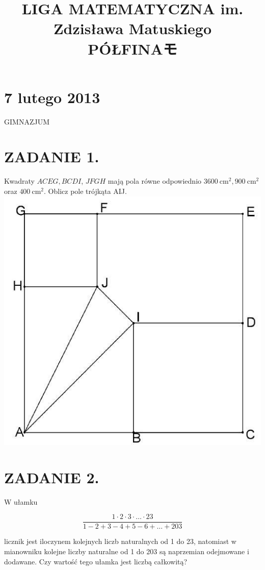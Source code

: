 \documentclass[10pt]{article}
\title{LIGA MATEMATYCZNA im. Zdzisława Matuskiego \\
 PÓŁFINAモ }
\author{}
\date{}
\begin{document}
\maketitle
\section*{7 lutego 2013}
GIMNAZJUM

\section*{ZADANIE 1.}
Kwadraty \(A C E G, B C D I\), \(J F G H\) mają pola równe odpowiednio \(3600 \mathrm{~cm}^{2}, 900 \mathrm{~cm}^{2}\) oraz \(400 \mathrm{~cm}^{2}\). Oblicz pole trójkąta AIJ.\\
\includegraphics[max width=\textwidth, center]{2024_11_21_63b5750d3d350075f4b4g-1}

\section*{ZADANIE 2.}
W ułamku

\[
\frac{1 \cdot 2 \cdot 3 \cdot \ldots \cdot 23}{1-2+3-4+5-6+\ldots+203}
\]

licznik jest iloczynem kolejnych liczb naturalnych od 1 do 23, natomiast w mianowniku kolejne liczby naturalne od 1 do 203 są naprzemian odejmowane i dodawane. Czy wartość tego ułamka jest liczbą całkowitą?
\end{document}
